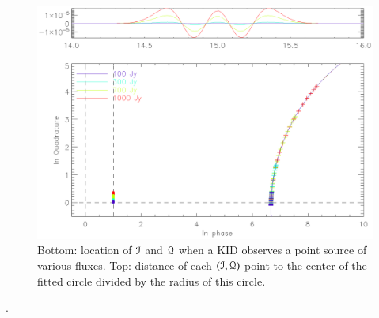 \begin{figure}
\includegraphics[clip, angle=0, width=\columnwidth]{Figures/circle_zres.eps}
\caption{Bottom: location of $\mathcal{I}$ and $\mathcal{Q}$ when a KID observes a point source of
various fluxes. Top: distance of each $(\mathcal{I},\mathcal{Q})$ point to the center of the
fitted circle divided by the radius of this circle.}
\label{fig:circle_zres}
\end{figure}

.\\

